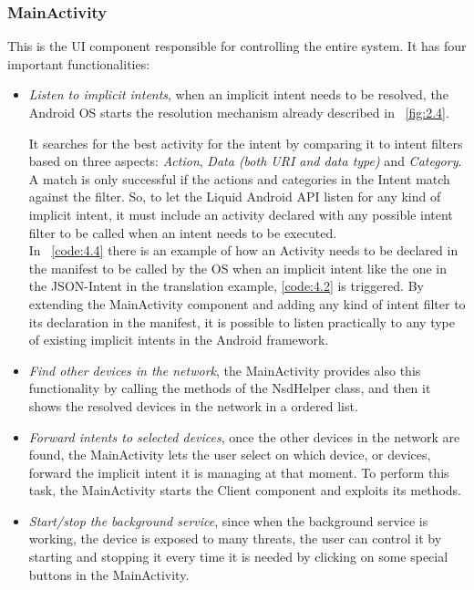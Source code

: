 \subsubsection{MainActivity}
This is the UI component responsible for controlling the entire system. It has four important functionalities:
\begin{itemize}
	\item \textit{Listen to implicit intents}, when an implicit intent needs to be resolved, the Android OS starts the resolution mechanism already described in \figurename~\ref{fig:2.4}.
	
	It searches for the best activity for the intent by comparing it to intent filters based on three aspects: \textit{Action}, \textit{Data (both URI and data type)} and \textit{Category}. A match is only successful if the actions and categories in the Intent match against the filter. So, to let the Liquid Android API listen for any kind of implicit intent, it must include an activity declared with any possible intent filter to be called when an intent needs to be executed.\\
	In \lstlistingname~\ref{code:4.4} there is an example of how an Activity needs to be declared in the manifest to be called by the OS when an implicit intent like the one in the JSON-Intent in the translation example, \ref{code:4.2} is triggered.
	By extending the MainActivity component and adding any kind of intent filter to its declaration in the manifest, it is possible to listen practically to any type of existing implicit intents in the Android framework.
	\item \textit{Find other devices in the network}, the MainActivity provides also this functionality by calling the methods of the NsdHelper class, and then it shows the resolved devices in the network in a ordered list.
	\item \textit{Forward intents to selected devices}, once the other devices in the network are found, the MainActivity lets the user select on which device, or devices, forward the implicit intent it is managing at that moment. To perform this task, the MainActivity starts the Client component and exploits its methods.
	\item \textit{Start/stop the background service}, since when the background service is working, the device is exposed to many threats, the user can control it by starting and stopping it every time it is needed by clicking on some special buttons in the MainActivity. 
	
\end{itemize}

